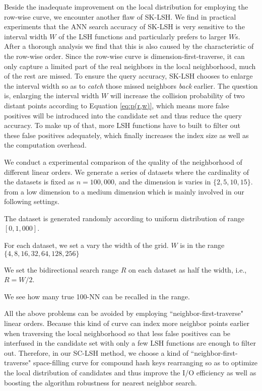 \documentclass[twocolumn]{svjour3}          %
\begin{document}
Beside the inadequate improvement on the local distribution for employing the row-wise curve, we encounter another flaw of SK-LSH. We find in practical experiments that the ANN search accuracy of SK-LSH is very sensitive to the interval width $W$ of the LSH functions and particularly prefers to larger $W$s.
After a thorough analysis we find that this is also caused by the characteristic of the row-wise order. Since the row-wise curve is dimension-first-traverse, it can only capture a limited part of the real neighbors in the local neighborhood, much of the rest are missed. To ensure the query accuracy, SK-LSH chooses to enlarge the interval width so as to \emph{catch} those missed neighbors \emph{back} earlier. The question is, enlarging the interval width $W$ will increase the collision probability of two distant points according to Equation \ref{eq:p(r,w)}, which means more false positives will be introduced into the candidate set and thus reduce the query accuracy. To make up of that, more LSH functions have to built to filter out these false positives adequately, which finally increases the index size as well as the computation overhead.

We conduct a experimental comparison of the quality of the neighborhood of different linear orders. We generate a series of datasets where the cardinality of the datasets is fixed as $n=100,000$, and the dimension is varies in $\{2,5,10,15\}$. from a low dimension to a medium dimension which is mainly involved in our following settings. 

The dataset is generated randomly according to uniform distribution of range $[0,1,000]$.

For each dataset, we set a vary the width of the grid. $W$ is in the range $\{4,8,16,32,64,128,256\}$

We set the bidirectional search range $R$ on each dataset as half the width, i.e., $R=W/2$.

We see how many true 100-NN can be recalled in the range.





All the above problems can be avoided by employing ``neighbor-first-traverse" linear orders. Because this kind of curve can index more neighbor points earlier when traversing the local neighborhood so that less false positives can be interfused in the candidate set with only a few LSH functions are enough to filter out.
Therefore, in our SC-LSH method, we choose a kind of ``neighbor-first-traverse" space-filling curve for compound hash keys rearranging so as to optimize the local distribution of candidates and thus improve the I/O efficiency as well as boosting the algorithm robustness for nearest neighbor search. 
\end{document}
